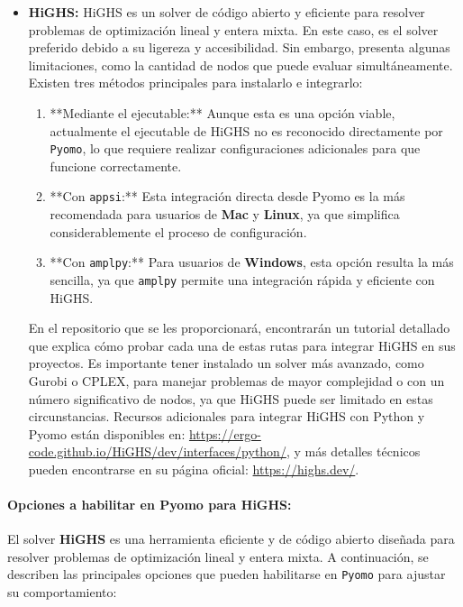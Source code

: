 \documentclass[12pt]{article}
\begin{document}
\begin{itemize}
    \item \textbf{HiGHS:} HiGHS es un solver de código abierto y eficiente para resolver problemas de optimización lineal y entera mixta. En este caso, es el solver preferido debido a su ligereza y accesibilidad. Sin embargo, presenta algunas limitaciones, como la cantidad de nodos que puede evaluar simultáneamente. Existen tres métodos principales para instalarlo e integrarlo:
    \begin{enumerate}
        \item **Mediante el ejecutable:** Aunque esta es una opción viable, actualmente el ejecutable de HiGHS no es reconocido directamente por \texttt{Pyomo}, lo que requiere realizar configuraciones adicionales para que funcione correctamente.
        \item **Con \texttt{appsi}:** Esta integración directa desde Pyomo es la más recomendada para usuarios de \textbf{Mac} y \textbf{Linux}, ya que simplifica considerablemente el proceso de configuración.
        \item **Con \texttt{amplpy}:** Para usuarios de \textbf{Windows}, esta opción resulta la más sencilla, ya que \texttt{amplpy} permite una integración rápida y eficiente con HiGHS.
    \end{enumerate}
    En el repositorio que se les proporcionará, encontrarán un tutorial detallado que explica cómo probar cada una de estas rutas para integrar HiGHS en sus proyectos. Es importante tener instalado un solver más avanzado, como Gurobi o CPLEX, para manejar problemas de mayor complejidad o con un número significativo de nodos, ya que HiGHS puede ser limitado en estas circunstancias. Recursos adicionales para integrar HiGHS con Python y Pyomo están disponibles en: \url{https://ergo-code.github.io/HiGHS/dev/interfaces/python/}, y más detalles técnicos pueden encontrarse en su página oficial: \url{https://highs.dev/}.
\end{itemize}

\paragraph{Opciones a habilitar en Pyomo para HiGHS:}
El solver \textbf{HiGHS} es una herramienta eficiente y de código abierto diseñada para resolver problemas de optimización lineal y entera mixta. A continuación, se describen las principales opciones que pueden habilitarse en \texttt{Pyomo} para ajustar su comportamiento:
\end{document}
